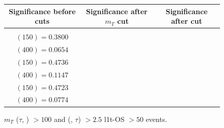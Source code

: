 \documentclass[letterpaper,12pt]{article}
\begin{document}
\begin{figure}[h!]
  \vspace{0.6cm}
  \tiny
  \setlength{\tabcolsep}{20pt}
  \renewcommand{\arraystretch}{1.6}
  \begin{tabular}{|c|c|c|}
    \hline
    Significance before cuts & Significance after $m_{T}$ cut & Significance after \DeltaR{} cut\\
    \hline
    \Gape[0.2cm]{\makecell{
        \sig{} $(100) = 0.2990$\\
        \sig{} $(150) = 0.3800$\\
        \sig{} $(400) = 0.0654$ }} & 
    \makecell{
      \sig{} $(100) = 0.2289$\\
      \sig{} $(150) = 0.4736$\\
      \sig{} $(400) = 0.1147$} & 
    \makecell{
      \sig{} $(100) = 0.3676$\\
      \sig{} $(150) = 0.4723$\\
      \sig{} $(400) = 0.0774$}\\
    \hline
  \end{tabular}
  \caption{$m_{T}$ ($\tau$, \met) $> 100$ and \DeltaR{} (\ls, $\tau$) $>2.5$ \2l1t-OS \metpt $>50$ events.}
  \label{fig:2l1tc3}
\end{figure}
\clearpage
\end{document}
